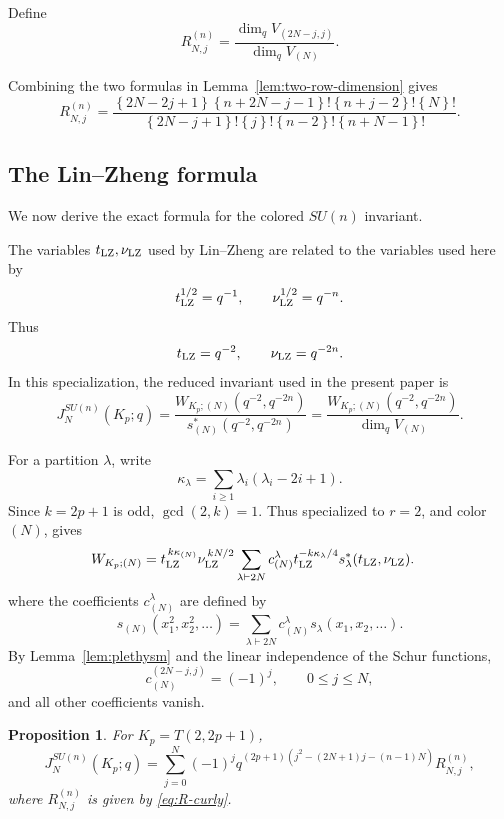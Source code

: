 \documentclass[11pt]{amsart}
\newtheorem{proposition}[theorem]{Proposition}
\newcommand{\curly}[1]{\left\{#1\right\}}
\begin{document}
Define
\begin{equation}\label{eq:R-def}
R_{N,j}^{(n)}
=
\frac{
\dim_qV_{(2N-j,j)}
}{
\dim_qV_{(N)}
}.
\end{equation}

Combining the two formulas in
Lemma~\ref{lem:two-row-dimension} gives
\begin{equation}\label{eq:R-curly}
R_{N,j}^{(n)}
=
\frac{
\curly{2N-2j+1}
\curly{n+2N-j-1}!
\curly{n+j-2}!
\curly{N}!
}{
\curly{2N-j+1}!
\curly{j}!
\curly{n-2}!
\curly{n+N-1}!
}.
\end{equation}


\subsection{The Lin--Zheng formula}


We now derive the exact formula for the colored \(SU(n)\) invariant.

The variables \(t_{\rm LZ},\nu_{\rm LZ}\) used by Lin--Zheng are
related to the variables used here by
\[
t_{\rm LZ}^{1/2}=q^{-1},
\qquad
\nu_{\rm LZ}^{1/2}=q^{-n}.
\]
Thus
\[
t_{\rm LZ}=q^{-2},
\qquad
\nu_{\rm LZ}=q^{-2n}.
\]
In this specialization, the reduced invariant used in the present
paper is
\begin{equation}\label{eq:reduced-normalization}
J_N^{SU(n)}(K_p;q)
=
\frac{W_{K_p;(N)}(q^{-2},q^{-2n})}
{s_{(N)}^*(q^{-2},q^{-2n})}
=
\frac{W_{K_p;(N)}(q^{-2},q^{-2n})}{\dim_qV_{(N)}}.
\end{equation}


For a partition \(\lambda\), write
\[
\kappa_\lambda
=
\sum_{i\geq1}\lambda_i(\lambda_i-2i+1).
\]
Since \(k=2p+1\) is odd, \(\gcd(2,k)=1\).  Thus
specialized to \(r=2\), and color \((N)\), \cite{LinZheng} gives
\begin{align}
W_{K_p;(N)}
&=
t_{\rm LZ}^{\,k\kappa_{(N)}}
\nu_{\rm LZ}^{\,kN/2}
\sum_{\lambda\vdash2N}
c_{(N)}^\lambda
t_{\rm LZ}^{-k\kappa_\lambda/4}
s_\lambda^*(t_{\rm LZ},\nu_{\rm LZ}).
\label{eq:LZ-special}
\end{align}
where the coefficients \(c_{(N)}^\lambda\) are defined by
\[
s_{(N)}(x_1^2,x_2^2,\ldots)
=
\sum_{\lambda\vdash 2N}
c_{(N)}^\lambda s_\lambda(x_1,x_2,\ldots).
\]
By Lemma~\ref{lem:plethysm} and the linear independence of the Schur
functions,
\[
c_{(N)}^{(2N-j,j)}=(-1)^j,
\qquad 0\leq j\leq N,
\]
and all other coefficients vanish.

\begin{proposition}\label{prop:torus-J}
For \(K_p=T(2,2p+1)\),
\begin{equation}\label{eq:torus-J}
J_N^{SU(n)}(K_p;q)
=
\sum_{j=0}^{N}
(-1)^j
q^{(2p+1)
\left(
j^2-(2N+1)j-(n-1)N
\right)}
R_{N,j}^{(n)},
\end{equation}
where \(R_{N,j}^{(n)}\) is given by
\eqref{eq:R-curly}.
\end{proposition}
\end{document}
